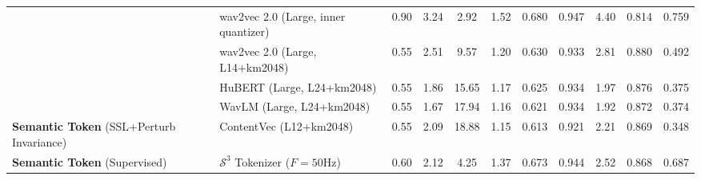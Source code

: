 \begin{table*}[]
{\begin{tabular}{@{}llccccccccc@{}}
 & wav2vec 2.0 (Large, inner quantizer) & 0.90 & 3.24 & 2.92 & 1.52 & 0.680 & 0.947 & 4.40 & 0.814 & 0.759 
 \\
 & wav2vec 2.0 (Large, L14+km2048) & 0.55 & 2.51 & 9.57 & 1.20 & 0.630 & 0.933 & 2.81 & 0.880 & 0.492 
 \\
 & HuBERT (Large, L24+km2048) & 0.55 &  1.86 & 15.65 & 1.17 & 0.625 & 0.934 & 1.97 & 0.876 & 0.375
 \\
 & WavLM (Large, L24+km2048) & 0.55 & 1.67 & 17.94 & 1.16 & 0.621 & 0.934 & 1.92 & 0.872 & 0.374
 \\
 \cmidrule(r){1-2}
\textbf{Semantic Token} (SSL+Perturb Invariance) & ContentVec (L12+km2048) & 0.55 &2.09  & 18.88 &  1.15 &  0.613 & 0.921 &  2.21 & 0.869 & 0.348
\\ 
\cmidrule(r){1-2}
\textbf{Semantic Token} (Supervised) & $\mathcal S^3$ Tokenizer ($F=50$Hz) & 0.60 & 2.12 & 4.25 & 1.37 & 0.673 & 0.944 & 2.52 & 0.868 & 0.687
\\
\bottomrule
\end{tabular}
}
\end{table*}

